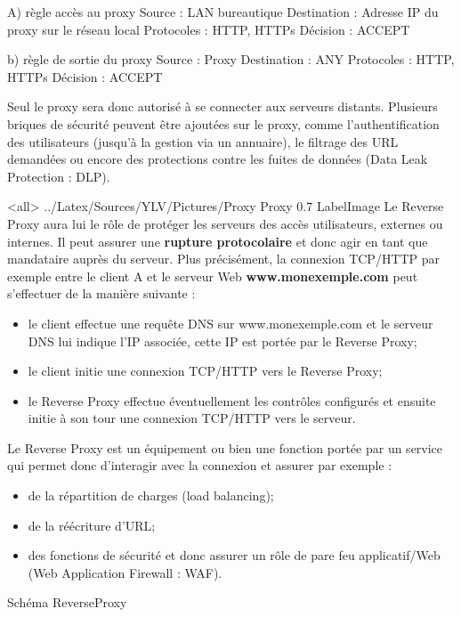A) règle accès au proxy
Source : LAN bureautique
Destination : Adresse IP du proxy sur le réseau local
Protocoles : HTTP, HTTPs
Décision : ACCEPT

b) règle de sortie du proxy
Source : Proxy
Destination : ANY
Protocoles : HTTP, HTTPs
Décision : ACCEPT

Seul le proxy sera donc autorisé à se connecter aux serveurs distants.
Plusieurs briques de sécurité peuvent être ajoutées sur le proxy, comme l'authentification des utilisateurs (jusqu'à la gestion via un annuaire), le filtrage des URL demandées ou encore des protections contre les fuites de données (Data Leak Protection : DLP).

\mode<all>{\picframe
{../Latex/Sources/YLV/Pictures/Proxy}%
{Proxy} %
{0.7} %
{LabelImage} %
}
Le Reverse Proxy aura lui le rôle de protéger les serveurs des accès utilisateurs, externes ou internes.
Il peut assurer une \textbf{rupture protocolaire} et donc agir en tant que mandataire auprès du serveur.
Plus précisément, la connexion TCP/HTTP par exemple entre le client A et le serveur Web \textbf{www.monexemple.com} peut s'effectuer de la manière suivante : 
\begin{itemize}
    \item le client effectue une requête DNS sur www.monexemple.com et le serveur DNS lui indique l'IP associée, cette IP est portée par le Reverse Proxy;
    \item le client initie une connexion TCP/HTTP vers le Reverse Proxy;
    \item le Reverse Proxy effectue éventuellement les contrôles configurés et ensuite initie à son tour une connexion TCP/HTTP vers le serveur.
\end{itemize}
Le Reverse Proxy est un équipement ou bien une fonction portée par un service qui permet donc d'interagir avec la connexion et assurer par exemple :
\begin{itemize}
    \item de la répartition de charges (load balancing);
    \item de la réécriture d'URL;
    \item des fonctions de sécurité et donc assurer un rôle de pare feu applicatif/Web (Web Application Firewall : WAF).
\end{itemize}
Schéma ReverseProxy


